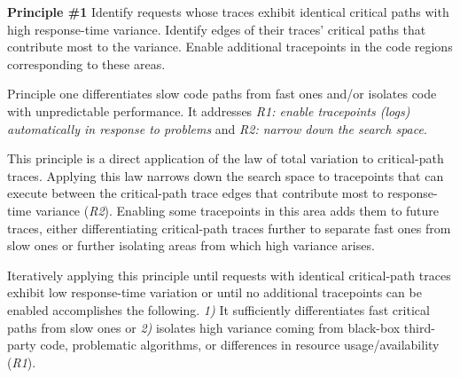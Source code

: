 
%

\noindent\textbf{Principle \#1} Identify requests whose traces exhibit
identical critical paths with high response-time
variance. Identify edges of their traces' critical paths that
contribute most to the variance.  Enable additional tracepoints in
the code regions corresponding to these areas.

Principle one differentiates slow code paths from fast ones and/or
isolates code with unpredictable performance.  It addresses
\textit{R1: enable tracepoints (logs) automatically in response to
  problems} and \textit{R2: narrow down the search space}.


This principle is a direct application of the law of total variation
to critical-path traces.  Applying this law narrows down the search
space to tracepoints that can execute between the critical-path trace
edges that contribute most to response-time variance (\textit{R2}).
Enabling some tracepoints in this area adds them to future traces,
either differentiating critical-path traces further to separate fast
ones from slow ones or further isolating areas from which high
variance arises.


Iteratively applying this principle until requests with identical
critical-path traces exhibit low response-time variation or until no
additional tracepoints can be enabled accomplishes the
following.  \textit{1)} It sufficiently differentiates fast critical
paths from slow ones or
\textit{2)} isolates high variance coming from black-box third-party
code, problematic algorithms, or differences in resource
usage/availability (\textit{R1}).

